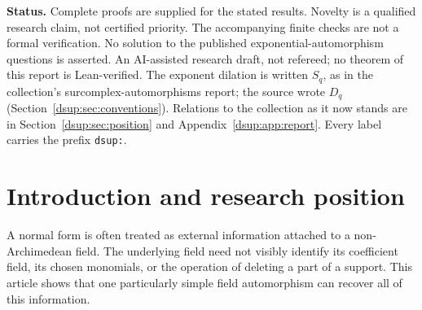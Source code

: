 \documentclass[11pt,oneside]{article}
\numberwithin{equation}{section}
\theoremstyle{definition}
\theoremstyle{remark}
\newcommand{\No}{\mathbf{No}}
\begin{document}
\begin{titlepage}
\begin{abstract}
The main structural application is that the single automorphism
$S_2(\sum a_gt^g)=\sum a_gt^{2g}$ defines the coefficient field, constant
coefficient, canonical monomials, every coefficient, the valuation ring,
and truncation in the language of fields with one automorphism. Consequently
its centralizer among \emph{all} field automorphisms consists precisely of
untwisted coefficient--exponent lifts; neither valuation preservation nor
strong additivity needs to be assumed. A uniform interpretation of full
monadic second-order arithmetic yields undecidability, and a coefficient
formula directly witnesses the tree property of the second kind. All
nonidentity rational dilations give the same definable normal-form data
when $\Gamma$ is divisible, although distinct rational dilations are not
conjugate. The elementwise results apply to $\No$ and $\No(i)$ through Conway
normal forms, with proper-class qualifications stated explicitly.
\end{abstract}
\vfill
{\small\color{Ink}\textbf{Status.} Complete proofs are supplied for the stated
results. Novelty is a qualified research claim, not certified priority.
The accompanying finite checks are not a formal verification. No solution
to the published exponential-automorphism questions is asserted.
An AI-assisted research draft, not refereed; no theorem of this report is
Lean-verified. The exponent dilation is written $S_q$, as in the
collection's surcomplex-automorphisms report; the source wrote $D_q$
(Section~\ref{dsup:sec:conventions}). Relations to the collection as it now
stands are in Section~\ref{dsup:sec:position} and
Appendix~\ref{dsup:app:report}. Every label carries the prefix
\texttt{dsup:}.}
\end{titlepage}
\hypersetup{pageanchor=true}

\begingroup
\small
\setlength{\parskip}{0pt}
\tableofcontents
\endgroup
\newpage

\section{Introduction and research position}\label{dsup:sec:intro}

A normal form is often treated as external information attached to a
non-Archimedean field. The underlying field need not visibly identify its
coefficient field, its chosen monomials, or the operation of deleting a
part of a support. This article shows that one particularly simple field
automorphism can recover all of this information.
\end{document}

